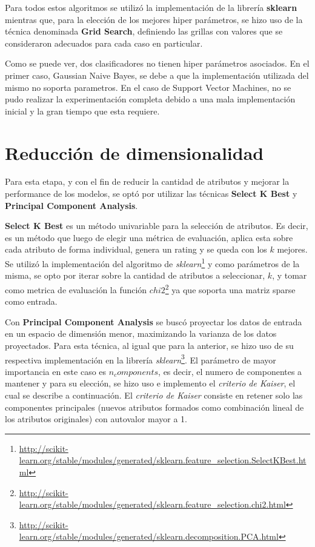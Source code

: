\documentclass[hidelinks,a4paper,11pt, nofootinbib]{article}
\begin{document}
Para todos estos algoritmos se utilizó la implementación de la librería \textbf{sklearn} mientras que, para la elección de los mejores hiper parámetros, se hizo uso de la técnica denominada \textbf{Grid Search}, definiendo las grillas con valores que se consideraron adecuados para cada caso en particular.

Como se puede ver, dos clasificadores no tienen hiper parámetros asociados. En el primer caso, Gaussian Naive Bayes, se debe a que la implementación utilizada del mismo no soporta parametros. En el caso de Support Vector Machines, no se pudo realizar la experimentación completa debido a una mala implementación inicial y la gran tiempo que esta requiere.


\section{Reducción de dimensionalidad}
Para esta etapa, y con el fin de reducir la cantidad de atributos y mejorar la performance de los modelos, se optó por utilizar las técnicas \textbf{Select K Best} y \textbf{Principal Component Analysis}.

\textbf{Select K Best} es un método univariable para la selección de atributos. Es decir, es un método que luego de elegir una métrica de evaluación, aplica esta sobre cada atributo de forma individual, genera un rating y se queda con los $k$ mejores. Se utilizó la implementación del algoritmo de \textit{sklearn}\footnote{\url{http://scikit-learn.org/stable/modules/generated/sklearn.feature_selection.SelectKBest.html}} y como parámetros de la misma, se opto por iterar sobre la cantidad de atributos a seleccionar, $k$, y tomar como metrica de evaluación la función $chi2$\footnote{\url{http://scikit-learn.org/stable/modules/generated/sklearn.feature_selection.chi2.html}} ya que soporta una matriz sparse como entrada.

Con \textbf{Principal Component Analysis} se buscó proyectar los datos de entrada en un espacio de dimensión menor, maximizando la varianza de los datos proyectados. Para esta técnica, al igual que para la anterior, se hizo uso de su respectiva implementación en la librería \textit{sklearn}\footnote{\url{http://scikit-learn.org/stable/modules/generated/sklearn.decomposition.PCA.html}}. El parámetro de mayor importancia en este caso es $n_components$, es decir, el numero de componentes a mantener y para su elección, se hizo uso e implemento el \textit{criterio de Kaiser}, el cual se describe a continuación. El \textit{criterio de Kaiser} consiste en retener solo las componentes principales (nuevos atributos formados como combinación lineal de los atributos originales) con autovalor mayor a 1.
\end{document}
